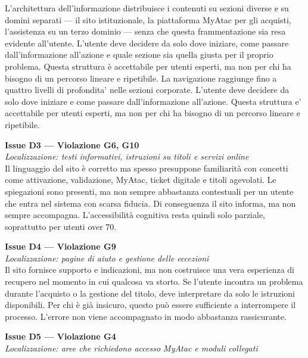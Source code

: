 \documentclass[11pt,a4paper]{article}
\begin{document}
\noindent L’architettura dell’informazione distribuisce i contenuti su sezioni diverse e su domini separati --- il sito istituzionale, la piattaforma MyAtac per gli acquisti, l'assistenza su un terzo dominio --- senza che questa frammentazione sia resa evidente all’utente. L’utente deve decidere da solo dove iniziare, come passare dall’informazione all’azione e quale sezione sia quella giusta per il proprio problema. Questa struttura è accettabile per utenti esperti, ma non per chi ha bisogno di un percorso lineare e ripetibile. La navigazione raggiunge fino a quattro livelli di profondita' nelle sezioni corporate. L'utente deve decidere da solo dove iniziare e come passare dall'informazione all'azione. Questa struttura e' accettabile per utenti esperti, ma non per chi ha bisogno di un percorso lineare e ripetibile.

\bigskip

\noindent\textbf{Issue D3 — Violazione G6, G10}\label{atac:D3}\\
\textit{Localizzazione: testi informativi, istruzioni su titoli e servizi online}\\

\noindent Il linguaggio del sito è corretto ma spesso presuppone familiarità con concetti come attivazione, validazione, MyAtac, ticket digitale e titoli agevolati. Le spiegazioni sono presenti, ma non sempre abbastanza contestuali per un utente che entra nel sistema con scarsa fiducia. Di conseguenza il sito informa, ma non sempre accompagna. L’accessibilità cognitiva resta quindi solo parziale, soprattutto per utenti over 70.

\bigskip

\noindent\textbf{Issue D4 — Violazione G9}\label{atac:D4}\\
\textit{Localizzazione: pagine di aiuto e gestione delle eccezioni}\\

\noindent Il sito fornisce supporto e indicazioni, ma non costruisce una vera esperienza di recupero nel momento in cui qualcosa va storto. Se l’utente incontra un problema durante l’acquisto o la gestione del titolo, deve interpretare da solo le istruzioni disponibili. Per chi è già insicuro, questo può essere sufficiente a interrompere il processo. L’errore non viene accompagnato in modo abbastanza rassicurante.

\bigskip

\noindent\textbf{Issue D5 — Violazione G4}\label{atac:D5}\\
\textit{Localizzazione: aree che richiedono accesso MyAtac e moduli collegati}\\
\end{document}

